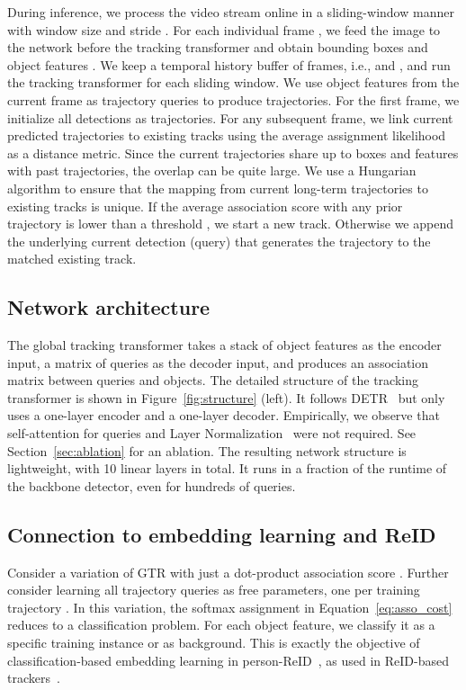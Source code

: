\documentclass[10pt,twocolumn,letterpaper]{article}
\let\oldsubsection\subsection
\renewcommand{\subsection}[1]{\vspace{-1mm}\oldsubsection{#1}\vspace{-1mm}}
\newcommand{\reffig}[1]{Figure~\ref{fig:#1}}
\newcommand{\refsec}[1]{Section~\ref{sec:#1}}
\newcommand{\refeq}[1]{Equation~\eqref{eq:#1}}
\newcommand{\lblsec}[1]{\label{sec:#1}}
\begin{document}
During inference, we process the video stream online in a sliding-window manner with window size  and stride .
For each individual frame , we feed the image to the network before the tracking transformer and obtain  bounding boxes  and object features .
We keep a temporal history buffer of  frames, i.e.,  and , and run the tracking transformer for each sliding window.
We use object features from the current frame  as trajectory queries  to produce  trajectories.
For the first frame, we initialize all detections as trajectories.
For any subsequent frame, we link current predicted trajectories to existing tracks using the average assignment likelihood  as a distance metric.
Since the current trajectories share up to  boxes and features with past trajectories, the overlap can be quite large.
We use a Hungarian algorithm to ensure that the mapping from current long-term trajectories to existing tracks is unique.
If the average association score with any prior trajectory is lower than a threshold , we start a new track.
Otherwise we append the underlying current detection (query) that generates the trajectory to the matched existing track.

\subsection{Network architecture}
The global tracking transformer takes a stack of object features  as the encoder input, a matrix of queries  as the decoder input, and produces an association matrix  between queries and objects.
The detailed structure of the tracking transformer is shown in \reffig{structure} (left).
It follows DETR~\cite{carion2020end} but only uses a one-layer encoder and a one-layer decoder.
Empirically, we observe that self-attention for queries and Layer Normalization~\cite{ba2016layer} were not required.
See \refsec{ablation} for an ablation.
The resulting network structure is lightweight, with 10 linear layers in total.
It runs in a fraction of the runtime of the backbone detector, even for hundreds of queries.


\subsection{Connection to embedding learning and ReID}
\lblsec{connection}
Consider a variation of GTR with just a dot-product association score .
Further consider learning all trajectory queries  as free parameters, one per training trajectory .
In this variation, the softmax assignment in \refeq{asso_cost} reduces to a classification problem.
For each object feature, we classify it as a specific training instance or as background.
This is exactly the objective of classification-based embedding learning in person-ReID~\cite{Luo_2019_CVPR_Workshops}, as used in ReID-based trackers~\cite{zhang2020fair,wang2019towards}.
\end{document}
